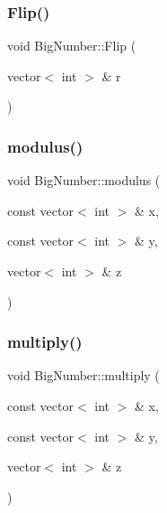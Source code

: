 \mbox{\label{class_big_number_a4a76b5eeaa9d6be09d2b3acaff576839}} 
\subsubsection{\texorpdfstring{Flip()}{Flip()}}
{\footnotesize\ttfamily void Big\+Number\+::\+Flip (\begin{DoxyParamCaption}\item[{vector$<$ int $>$ \&}]{r }\end{DoxyParamCaption})\hspace{0.3cm}{\ttfamily [private]}}

\mbox{\label{class_big_number_ac341f25984e6bfe4559dd6029209095c}} 
\subsubsection{\texorpdfstring{modulus()}{modulus()}}
{\footnotesize\ttfamily void Big\+Number\+::modulus (\begin{DoxyParamCaption}\item[{const vector$<$ int $>$ \&}]{x,  }\item[{const vector$<$ int $>$ \&}]{y,  }\item[{vector$<$ int $>$ \&}]{z }\end{DoxyParamCaption})\hspace{0.3cm}{\ttfamily [private]}}

\mbox{\label{class_big_number_a7100fbbaded92b611ebda6261d3cff9d}} 
\subsubsection{\texorpdfstring{multiply()}{multiply()}}
{\footnotesize\ttfamily void Big\+Number\+::multiply (\begin{DoxyParamCaption}\item[{const vector$<$ int $>$ \&}]{x,  }\item[{const vector$<$ int $>$ \&}]{y,  }\item[{vector$<$ int $>$ \&}]{z }\end{DoxyParamCaption})\hspace{0.3cm}{\ttfamily [private]}}

